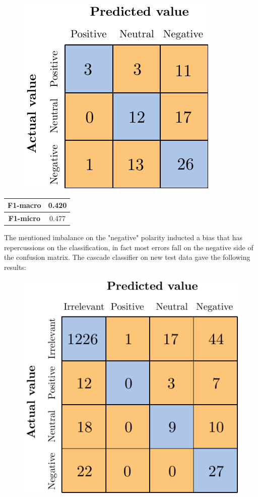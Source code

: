 \begin{figure}[H]
	\centering
	\includegraphics[scale=1]{figures/conf_matrices/ita_support/ita_snt_support_bpef_afs.pdf}
	\label{fig:ita_snt_support_bpef_afs}
\end{figure}

\begin{center}
	\begin{tabular}{ | c | c | } 
		\hline
		\textbf{F1-macro} & 0.420 \\
		\hline
		\textbf{F1-micro} & 0.477 \\ 
		\hline
	\end{tabular}
\end{center}

The mentioned imbalance on the "negative" polarity inducted a bias that has repercussions on the classification, in fact most errors fall on the negative side of the confusion matrix. The cascade classifier on new test data gave the following results:

\begin{figure}[H]
	\centering
	\includegraphics[scale=1]{figures/conf_matrices/ita_support/ita_cascade_support_bpef_tst.pdf}
	\label{fig:ita_cascade_support_bpef_tst}
\end{figure}


